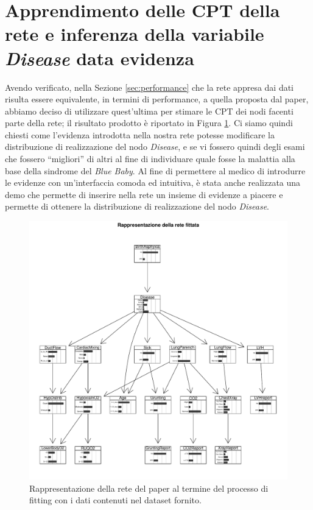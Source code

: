 \section{Apprendimento delle CPT della rete e inferenza della variabile \textit{Disease} data evidenza}
Avendo verificato, nella Sezione \ref{sec:performance} che la rete appresa dai dati risulta essere equivalente, in termini di performance, a quella proposta dal paper, abbiamo deciso di utilizzare quest'ultima per stimare le CPT dei nodi facenti parte della rete; il risultato prodotto è riportato in Figura \ref{fig:paperfitted}. Ci siamo quindi chiesti come l'evidenza introdotta nella nostra rete potesse modificare la distribuzione di realizzazione del nodo \textit{Disease}, e se vi fossero quindi degli esami che fossero “migliori” di altri al fine di individuare quale fosse la malattia alla base della sindrome del \textit{Blue Baby}. Al fine di permettere al medico di introdurre le evidenze con un'interfaccia comoda ed intuitiva, è stata anche realizzata una demo che permette di inserire nella rete un insieme di evidenze a piacere e permette di ottenere la distribuzione di realizzazione del nodo \textit{Disease}.
\begin{figure}
	\centering
	\includegraphics[width=1\linewidth]{images/paper_fitted}
	\caption{Rappresentazione della rete del paper al termine del processo di fitting con i dati contenuti nel dataset fornito.}
	\label{fig:paperfitted}
\end{figure}
